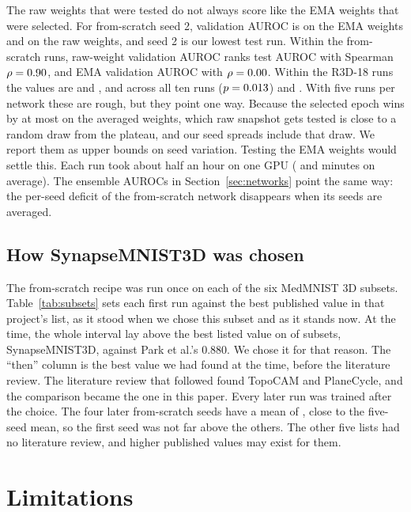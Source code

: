 \documentclass[conference]{IEEEtran}
\begin{document}
The raw weights that were tested do not always score like the EMA weights that were
selected. For from-scratch seed 2, validation AUROC is \ValEmaScratchTwo{} on the EMA weights
and \ValRawScratchTwo{} on the raw weights, and seed 2 is our lowest test run. Within the from-scratch runs, raw-weight validation AUROC ranks test AUROC with Spearman
$\rho=0.90{}$, and EMA validation AUROC with $\rho=0.00{}$. Within the
R3D-18 runs the values are \rhoRawKinetics{} and \rhoEmaKinetics{}, and across all ten runs
\rhoRawTest{} ($p=0.013{}$) and \rhoEmaTest{}. With five runs per network these are
rough, but they point one way. Because the selected epoch wins by at most
\maxSelectionMargin{} on the averaged weights, which raw snapshot gets tested is close to a
random draw from the plateau, and our seed spreads include that draw. We report them as
upper bounds on seed variation. Testing the EMA weights would settle this. Each run took about half an hour on one GPU (\minutesScratch{} and
\minutesKinetics{} minutes on average). The ensemble AUROCs in Section~\ref{sec:networks}
point the same way: the per-seed deficit of the from-scratch network disappears when its
seeds are averaged.

\subsection{How SynapseMNIST3D was chosen}
\label{sec:selection}



The from-scratch recipe was run once on each of the six MedMNIST 3D subsets.
Table~\ref{tab:subsets} sets each first run against the best published value in that
project's list, as it stood when we chose this subset and as it stands now. At the time,
the whole interval lay above the best listed value on \subsetsAboveThen{} of
\subsetsTotal{} subsets, SynapseMNIST3D, against Park et al.'s 0.880. We chose it for that reason. The ``then'' column is the best value we had found at the
time, before the literature review. The literature review that followed found TopoCAM and PlaneCycle, and the
comparison became the one in this paper. Every later run was trained after the choice. The
four later from-scratch seeds have a mean of \laterMeanAurocScratch{}, close to the
five-seed mean, so the first seed was not far above the others. The other five lists had
no literature review, and higher published values may exist for them.

\section{Limitations}
\label{sec:limits}
\end{document}
